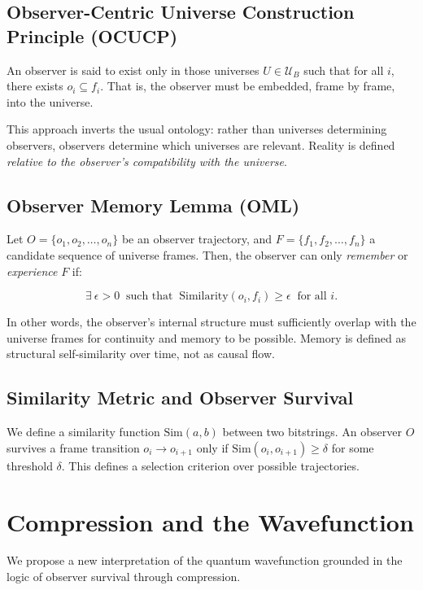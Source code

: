 \documentclass[12pt]{article}
\begin{document}
\subsection{Observer-Centric Universe Construction Principle (OCUCP)}

An observer is said to exist only in those universes $U \in \mathcal{U}_B$ such that for all $i$, there exists $o_i \subseteq f_i$. That is, the observer must be embedded, frame by frame, into the universe.

This approach inverts the usual ontology: rather than universes determining observers, observers determine which universes are relevant. Reality is defined \emph{relative to the observer's compatibility with the universe}.

\subsection{Observer Memory Lemma (OML)}

Let $O = \{o_1, o_2, \ldots, o_n\}$ be an observer trajectory, and $F = \{f_1, f_2, \ldots, f_n\}$ a candidate sequence of universe frames. Then, the observer can only \emph{remember} or \emph{experience} $F$ if:

\[
    \exists\ \epsilon > 0\ \text{ such that }\ \text{Similarity}(o_i, f_i) \ge \epsilon\ \text{ for all } i.
\]

In other words, the observer's internal structure must sufficiently overlap with the universe frames for continuity and memory to be possible. Memory is defined as structural self-similarity over time, not as causal flow.

\subsection{Similarity Metric and Observer Survival}

We define a similarity function $\text{Sim}(a, b)$ between two bitstrings. An observer $O$ survives a frame transition $o_i \to o_{i+1}$ only if $\text{Sim}(o_i, o_{i+1}) \ge \delta$ for some threshold $\delta$. This defines a selection criterion over possible trajectories.

\section{Compression and the Wavefunction}

We propose a new interpretation of the quantum wavefunction grounded in the logic of observer survival through compression.
\end{document}
